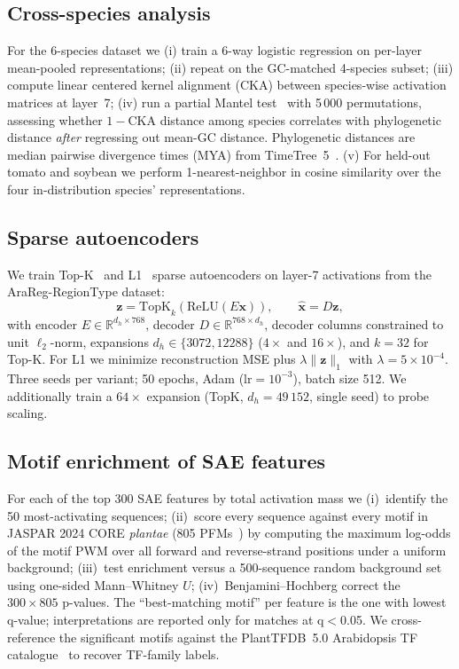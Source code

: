 \documentclass[11pt, a4paper]{article}
\begin{document}
\subsection*{Cross-species analysis}
\label{sec:species-methods}
For the 6-species dataset we (i) train a 6-way logistic regression on
per-layer mean-pooled representations; (ii) repeat on the GC-matched
4-species subset; (iii) compute linear centered kernel alignment (CKA)
between species-wise activation matrices at layer~7; (iv) run a partial
Mantel test~\citep{legendre2012numerical} with 5\,000 permutations,
assessing whether $1{-}\mathrm{CKA}$ distance among species correlates
with phylogenetic distance \emph{after} regressing out mean-GC distance.
Phylogenetic distances are median pairwise divergence times (MYA) from
TimeTree~5~\citep{kumar2022timetree}. (v) For held-out tomato and soybean
we perform 1-nearest-neighbor in cosine similarity over the four
in-distribution species' representations.

\subsection*{Sparse autoencoders}
We train Top-K~\citep{gao2024scaling} and L1~\citep{bricken2023monosemanticity}
sparse autoencoders on layer-7 activations from the AraReg-RegionType dataset:
\begin{equation}
    \mathbf{z} = \mathrm{TopK}_{k}\!\left(\mathrm{ReLU}(E\mathbf{x})\right),
    \qquad
    \hat{\mathbf{x}} = D\mathbf{z},
\end{equation}
with encoder $E \in \mathbb{R}^{d_h \times 768}$, decoder
$D \in \mathbb{R}^{768 \times d_h}$, decoder columns constrained to unit
$\ell_2$-norm, expansions $d_h \in \{3072, 12288\}$ ($4\times$ and
$16\times$), and $k{=}32$ for Top-K. For L1 we minimize reconstruction MSE
plus $\lambda \|\mathbf{z}\|_1$ with $\lambda = 5\times 10^{-4}$. Three
seeds per variant; 50 epochs, Adam ($\text{lr}{=}10^{-3}$), batch size 512.
We additionally train a $64\times$ expansion (TopK, $d_h=49\,152$, single
seed) to probe scaling.

\subsection*{Motif enrichment of SAE features}
\label{sec:motif-methods}
For each of the top 300 SAE features by total activation mass we
(i)~identify the 50 most-activating sequences; (ii)~score every sequence
against every motif in JASPAR 2024 CORE \textit{plantae} (805
PFMs~\citep{rauluseviciute2024jaspar}) by computing the maximum log-odds of
the motif PWM over all forward and reverse-strand positions under a
uniform background; (iii)~test enrichment versus a 500-sequence random
background set using one-sided Mann--Whitney $U$; (iv)~Benjamini--Hochberg
correct the $300 \times 805$ p-values. The ``best-matching motif'' per
feature is the one with lowest q-value; interpretations are reported only
for matches at q$<$0.05. We cross-reference the significant motifs against
the PlantTFDB~5.0 Arabidopsis TF catalogue~\citep{tian2020plantregmap} to
recover TF-family labels.
\end{document}
